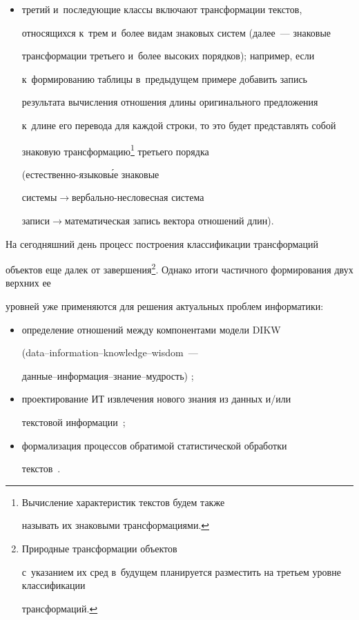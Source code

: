 \begin{itemize}
\item третий и~последующие классы включают трансформации текстов, 

относящихся к~трем и~более видам знаковых систем (далее~--- знаковые 

трансформации третьего и~более высоких порядков); например, если 

к~формированию таб\-ли\-цы в~предыдущем примере добавить запись 

результата вычисления отношения длины оригинального предложения 

к~длине его перевода для каждой строки, то это будет представлять собой 

знаковую трансформацию\footnote[1]{Вычисление характеристик текстов будем также 

называть их знаковыми трансформациями.} третьего порядка  

(ес\-тест\-вен\-но-язы\-ко\-в\'{ы}е знаковые  

сис\-те\-мы\;$\to$\;вер\-баль\-но-не\-сло\-вес\-ная сис\-те\-ма  

за\-пи\-си\;$\to$\;ма\-те\-ма\-ти\-че\-ская запись вектора отношений длин).\\[-13pt]

\end{itemize}







  На сегодняшний день процесс построения классификации трансформаций 

объектов еще далек от завершения\footnote[2]{Природные трансформации объектов 

с~указанием их сред в~будущем планируется разместить на третьем уровне классификации 

трансформаций.}. Однако итоги частичного формирования двух верхних ее 

уровней уже применяются для решения актуальных проблем информатики:\\[-13pt]

  \begin{itemize}

  \item определение отношений между компонентами модели DIKW  

(data--information--knowledge--wisdom~---  

дан\-ные--ин\-фор\-ма\-ция--зна\-ние--муд\-рость) \cite{8-zac, 9-zac};%

  \item проектирование ИТ извлечения нового знания из данных и\!/\!или 

текстовой информации~\cite{17-zac};\\[-13pt]

  \item формализация процессов обратимой статистической обработки 

текстов~\cite{18-zac}.\\[-13pt]

  \end{itemize}

